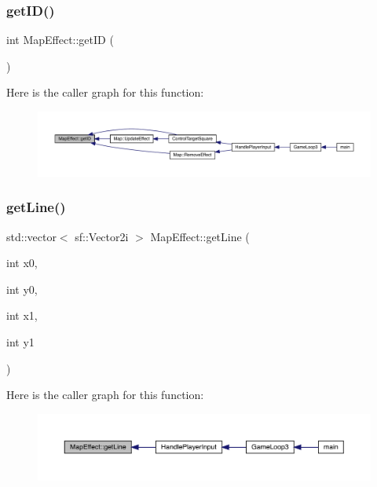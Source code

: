 \mbox{\label{class_map_effect_af05848201790b0038c5b61659b116706}} 
\subsubsection{\texorpdfstring{get\+I\+D()}{getID()}}
{\footnotesize\ttfamily int Map\+Effect\+::get\+ID (\begin{DoxyParamCaption}{ }\end{DoxyParamCaption})}

Here is the caller graph for this function\+:
\nopagebreak
\begin{figure}[H]
\begin{center}
\leavevmode
\includegraphics[width=350pt]{class_map_effect_af05848201790b0038c5b61659b116706_icgraph}
\end{center}
\end{figure}
\mbox{\label{class_map_effect_a7aeebd5eef57c00feabca583a38c5361}} 
\subsubsection{\texorpdfstring{get\+Line()}{getLine()}}
{\footnotesize\ttfamily std\+::vector$<$ sf\+::\+Vector2i $>$ Map\+Effect\+::get\+Line (\begin{DoxyParamCaption}\item[{int}]{x0,  }\item[{int}]{y0,  }\item[{int}]{x1,  }\item[{int}]{y1 }\end{DoxyParamCaption})}

Here is the caller graph for this function\+:
\nopagebreak
\begin{figure}[H]
\begin{center}
\leavevmode
\includegraphics[width=350pt]{class_map_effect_a7aeebd5eef57c00feabca583a38c5361_icgraph}
\end{center}
\end{figure}
\mbox{\label{class_map_effect_a4557d94941b97471dce7ac47e30825c5}} 

